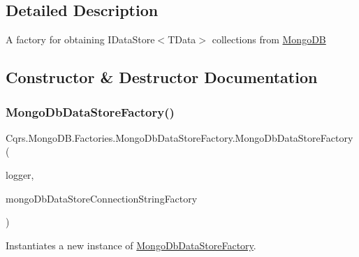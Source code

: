 \subsection{Detailed Description}
A factory for obtaining I\+Data\+Store$<$\+T\+Data$>$ collections from \hyperlink{namespaceCqrs_1_1MongoDB}{Mongo\+DB} 



\subsection{Constructor \& Destructor Documentation}
\mbox{\label{classCqrs_1_1MongoDB_1_1Factories_1_1MongoDbDataStoreFactory_a5306704647ba6dab35844231ca999b7e_a5306704647ba6dab35844231ca999b7e}} 
\subsubsection{\texorpdfstring{Mongo\+Db\+Data\+Store\+Factory()}{MongoDbDataStoreFactory()}}
{\footnotesize\ttfamily Cqrs.\+Mongo\+D\+B.\+Factories.\+Mongo\+Db\+Data\+Store\+Factory.\+Mongo\+Db\+Data\+Store\+Factory (\begin{DoxyParamCaption}\item[{I\+Logger}]{logger,  }\item[{\hyperlink{interfaceCqrs_1_1MongoDB_1_1Factories_1_1IMongoDbDataStoreConnectionStringFactory}{I\+Mongo\+Db\+Data\+Store\+Connection\+String\+Factory}}]{mongo\+Db\+Data\+Store\+Connection\+String\+Factory }\end{DoxyParamCaption})}



Instantiates a new instance of \hyperlink{classCqrs_1_1MongoDB_1_1Factories_1_1MongoDbDataStoreFactory}{Mongo\+Db\+Data\+Store\+Factory}. 



